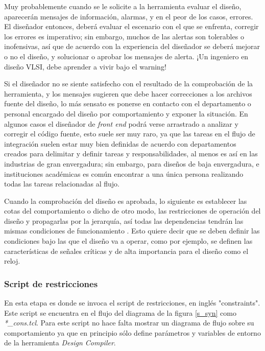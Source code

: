 Muy probablemente cuando se le solicite a la herramienta evaluar el diseño, aparecerán mensajes de información, alarmas, y en el peor de los casos, errores. El diseñador entonces, deberá evaluar el escenario con el que se enfrenta, corregir los errores es imperativo; sin embargo, muchos de las alertas son tolerables o inofensivas, así que de acuerdo con la experiencia del diseñador se deberá mejorar o no el diseño, y solucionar o aprobar los mensajes de alerta. ¡Un ingeniero en diseño VLSI, debe aprender a vivir bajo el warning!


Si el diseñador no se siente satisfecho con el resultado de la comprobación de la herramienta, y los mensajes sugieren que debe hacer correcciones a los archivos fuente del diseño, lo más sensato es ponerse en contacto con el departamento o personal encargado del diseño por comportamiento y exponer la situación. En algunos casos el diseñador de \textit{front end} podrá verse arrastrado a analizar y corregir el código fuente, esto suele ser muy raro, ya que las tareas en el flujo de integración suelen estar muy bien definidas de acuerdo con departamentos creados para delimitar y definir tareas y responsabilidades, al menos es así en las industrias de gran envergadura; sin embargo, para diseños de baja envergadura, e instituciones académicas es común encontrar a una única persona realizando todas las tareas relacionadas al flujo.

Cuando la comprobación del diseño es aprobada, lo siguiente es establecer las cotas del comportamiento o dicho de otro modo, las restricciones de operación del diseño y propagarlas por la jerarquía, así todas las dependencias tendrán las mismas condiciones de funcionamiento . Esto quiere decir que se deben definir las condiciones bajo las que el diseño va a operar, como por ejemplo, se definen las características de señales críticas y de alta importancia para el diseño como el reloj.

\subsubsection{Script de restricciones}

En esta etapa es donde se invoca el script de restricciones, en inglés "constraints". Este script se encuentra en el flujo del diagrama de la figura \ref{s_syn} como \textit{*\_cons.tcl}. Para este script no hace falta mostrar un diagrama de flujo sobre su comportamiento ya que en principio sólo define parámetros y variables de entorno de la herramienta \textit{Design Compiler}.

